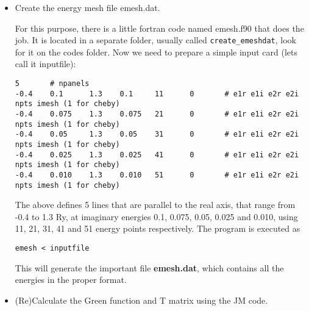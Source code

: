 \documentclass[11pt,fleqn]{book} %
\begin{document}
\begin{itemize}

\item Create the energy mesh file emesh.dat.

For this purpose, there is a little
fortran code named emesh.f90 that does the job.
It is located in a separate folder, usually called \verb|create_emeshdat|,
look for it on the codes folder. Now we need to prepare a simple input card
(lets call it inputfile):
\begin{VBox}
\begin{verbatim}
5       # npanels
-0.4    0.1      1.3    0.1     11      0       # e1r e1i e2r e2i npts imesh (1 for cheby)
-0.4    0.075    1.3    0.075   21      0       # e1r e1i e2r e2i npts imesh (1 for cheby)
-0.4    0.05     1.3    0.05    31      0       # e1r e1i e2r e2i npts imesh (1 for cheby)
-0.4    0.025    1.3    0.025   41      0       # e1r e1i e2r e2i npts imesh (1 for cheby)
-0.4    0.010    1.3    0.010   51      0       # e1r e1i e2r e2i npts imesh (1 for cheby)
\end{verbatim}
\end{VBox}
The above defines 5 lines that are parallel to the real axis, that range from
-0.4 to 1.3 Ry, at imaginary energies 0.1,  0.075, 0.05, 0.025 and 0.010,
using 11, 21, 31, 41 and 51 energy points respectively. The program is executed as
\begin{VBox}
\begin{verbatim}
emesh < inputfile
\end{verbatim}
\end{VBox}
This will generate the important file \textbf{emesh.dat}, which contains all the energies
in the proper format.

\item (Re)Calculate the Green function and T matrix using the JM code.


\end{itemize}
\end{document}
